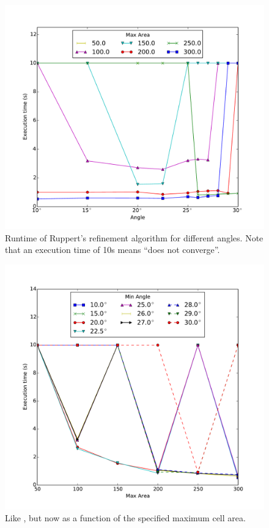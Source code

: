 \begin{figure}[t!]
    \centering
    \includegraphics[width=\columnwidth]{../images/ruppert.pdf}
    \caption{Runtime of Ruppert's refinement algorithm for different angles. Note that an execution time of 10s means ``does not converge''.}
    \label{fig:ruppert-runtime}
\end{figure}

\begin{figure}[t!]
    \centering
    \includegraphics[width=\columnwidth]{../images/ruppert2.pdf}
    \caption{Like , but now as a function of the specified maximum cell area.}
    \label{fig:ruppert-runtime2}
\end{figure}


